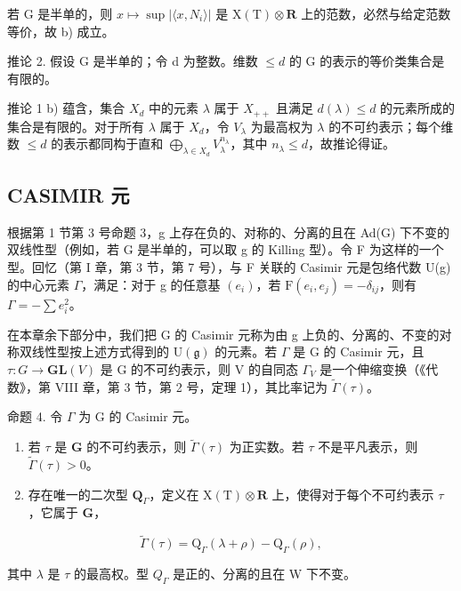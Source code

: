 若 G 是半单的，则 \(x \mapsto \sup |\langle x, N_{i} \rangle|\) 是 \(\mathrm{X(T)} \otimes \mathbf{R}\) 上的范数，必然与给定范数等价，故 b) 成立。

推论 2. 假设 G 是半单的；令 d 为整数。维数 \(\leq d\) 的 G 的表示的等价类集合是有限的。

推论 1 b) 蕴含，集合 \(X_{d}\) 中的元素 \(\lambda\) 属于 \(X_{++}\) 且满足 \(d(\lambda) \leq d\) 的元素所成的集合是有限的。对于所有 \(\lambda\) 属于 \(X_{d}\)，令 \(V_{\lambda}\) 为最高权为 \(\lambda\) 的不可约表示；每个维数 \(\leq d\) 的表示都同构于直和 \(\bigoplus_{\lambda \in X_{d}} V_{\lambda}^{n_{\lambda}}\)，其中 \(n_{\lambda} \leq d\)，故推论得证。

\subsection{CASIMIR 元}

根据第 1 节第 3 号命题 3，g 上存在负的、对称的、分离的且在 Ad(G) 下不变的双线性型（例如，若 G 是半单的，可以取 g 的 Killing 型）。令 F 为这样的一个型。回忆（第 I 章，第 3 节，第 7 号），与 F 关联的 Casimir 元是包络代数 U(g) 的中心元素 \(\Gamma\)，满足：对于 g 的任意基 \((e_{i})\)，若 \(\mathrm{F}(e_{i}, e_{j}) = -\delta_{ij}\)，则有 \(\Gamma = -\sum e_{i}^{2}\)。

在本章余下部分中，我们把 G 的 Casimir 元称为由 g 上负的、分离的、不变的对称双线性型按上述方式得到的 \(\mathrm{U}(\mathfrak{g})\) 的元素。若 \(\Gamma\) 是 G 的 Casimir 元，且 \(\tau: G \to \mathbf{GL}(V)\) 是 G 的不可约表示，则 V 的自同态 \(\Gamma_{V}\) 是一个伸缩变换（《代数》，第 VIII 章，第 3 节，第 2 号，定理 1），其比率记为 \(\tilde{\Gamma}(\tau)\)。

命题 4. 令 \(\Gamma\) 为 G 的 Casimir 元。

\begin{enumerate}
\def\labelenumi{\alph{enumi})}
\item
  若 \(\tau\) 是 \(\mathbf{G}\) 的不可约表示，则 \(\tilde{\Gamma}(\tau)\) 为正实数。若 \(\tau\) 不是平凡表示，则 \(\tilde{\Gamma}(\tau) > 0\)。
\item
  存在唯一的二次型 \(\mathbf{Q}_{\Gamma}\)，定义在 \(\mathrm{X(T)}\otimes \mathbf{R}\) 上，使得对于每个不可约表示 \(\tau\)，它属于 \(\mathbf{G}\)，
\end{enumerate}

\[
\tilde {\Gamma} (\tau) = \mathrm{Q} _ {\Gamma} (\lambda + \rho) - \mathrm{Q} _ {\Gamma} (\rho),
\]

其中 \(\lambda\) 是 \(\tau\) 的最高权。型 \(Q_{\Gamma}\) 是正的、分离的且在 W 下不变。

